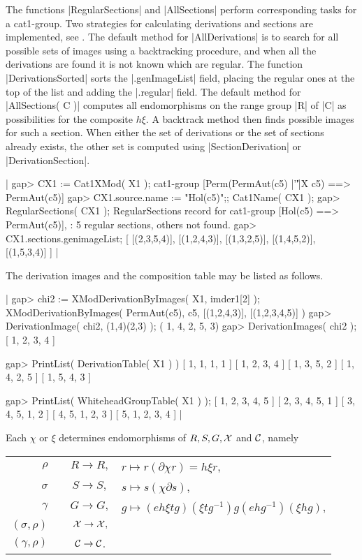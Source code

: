 The functions |RegularSections| and |AllSections| perform corresponding 
tasks for a cat1-group.
Two strategies for calculating derivations and sections are implemented,
see \cite{AW1}.
The default method for |AllDerivations| is to search for all possible
sets of images using a backtracking procedure, and when all the derivations
are found it is not known which are regular.
The function |DerivationsSorted| sorts the |.genImageList| field, placing
the regular ones at the top of the list and adding the |.regular| field.
The default method for |AllSections( C )| computes all endomorphisms
on the range group |R| of |C| as possibilities for the composite $h\xi$.
A backtrack method then finds possible images for such a section.
When either the set of derivations or the set of sections already exists, 
the other set is computed using |SectionDerivation| or |DerivationSection|.

|    gap> CX1 := Cat1XMod( X1 );
    cat1-group [Perm(PermAut(c5) |'\|'|X c5) ==> PermAut(c5)] 
    gap> CX1.source.name := "Hol(c5)";; Cat1Name( CX1 );
    gap> RegularSections( CX1 );
    RegularSections record for cat1-group [Hol(c5) ==> PermAut(c5)],
    : 5 regular sections, others not found.
    gap> CX1.sections.genimageList;
    [ [(2,3,5,4)], [(1,2,4,3)], [(1,3,2,5)], [(1,4,5,2)], [(1,5,3,4)] ]  |

The derivation images and the composition table may be listed as follows.

|    gap> chi2 := XModDerivationByImages( X1, imder1[2] ); 
    XModDerivationByImages( PermAut(c5), c5, [(1,2,4,3)], [(1,2,3,4,5)] )
    gap> DerivationImage( chi2, (1,4)(2,3) );
    ( 1, 4, 2, 5, 3)
    gap> DerivationImages( chi2 );
    [ 1, 2, 3, 4 ]

    gap> PrintList( DerivationTable( X1 ) )
    [ 1, 1, 1, 1 ]
    [ 1, 2, 3, 4 ]
    [ 1, 3, 5, 2 ]
    [ 1, 4, 2, 5 ]
    [ 1, 5, 4, 3 ]

    gap> PrintList( WhiteheadGroupTable( X1 ) );
    [ 1, 2, 3, 4, 5 ]
    [ 2, 3, 4, 5, 1 ]
    [ 3, 4, 5, 1, 2 ]
    [ 4, 5, 1, 2, 3 ]
    [ 5, 1, 2, 3, 4 ]  |


Each  $\chi$  or  $\xi$  determines endomorphisms of  
$R, S, G, {\cal X}$ and ${\cal C}$, namely\:
\begin{center}
\begin{tabular}{rccl}
    $\rho$  &  \:  &  $R \to R,$ 
                  &  $r \mapsto r(\partial \chi r) = h \xi r$,  \\
  $\sigma$  &  \:  &  $S \to S,$
                  &  $s \mapsto s(\chi \partial s)$,            \\
  $\gamma$  &  \:  &  $G \to G,$
                  &  $g \mapsto (eh \xi tg)(\xi tg^{-1})g(ehg^{-1})(\xi hg)$,\\
  $(\sigma,\rho)$ & \:  & ${\cal X} \to {\cal X},$              \\
  $(\gamma,\rho)$ & \:  & ${\cal C} \to {\cal C}$.
\end{tabular}
\end{center}

